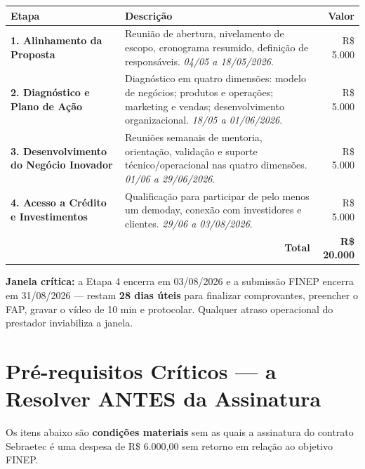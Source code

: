 \documentclass[11pt, a4paper]{article}
\newcommand{\destaque}[2]{%
    \vspace{2pt}
    \colorbox{#1!10}{%
        \parbox{\dimexpr\textwidth-2\fboxsep}{%
            \small #2%
        }%
    }
    \vspace{4pt}
}
\begin{document}
\renewcommand{\arraystretch}{1.25}
\begin{table}[H]
    \centering
    \small
    \begin{tabularx}{\textwidth}{@{} l X r @{}}
        \toprule
        \rowcolor{tableHeader} \textbf{Etapa} & \textbf{Descrição} & \textbf{Valor} \\
        \midrule
        \textbf{1. Alinhamento da Proposta} & Reunião de abertura, nivelamento de escopo, cronograma resumido, definição de responsáveis. \textit{04/05 a 18/05/2026}. & R\$ 5.000 \\
        \rowcolor{lightGray}
        \textbf{2. Diagnóstico e Plano de Ação} & Diagnóstico em quatro dimensões: modelo de negócios; produtos e operações; marketing e vendas; desenvolvimento organizacional. \textit{18/05 a 01/06/2026}. & R\$ 5.000 \\
        \textbf{3. Desenvolvimento do Negócio Inovador} & Reuniões semanais de mentoria, orientação, validação e suporte técnico/operacional nas quatro dimensões. \textit{01/06 a 29/06/2026}. & R\$ 5.000 \\
        \rowcolor{lightGray}
        \textbf{4. Acesso a Crédito e Investimentos} & Qualificação para participar de pelo menos um demoday, conexão com investidores e clientes. \textit{29/06 a 03/08/2026}. & R\$ 5.000 \\
        \midrule
        \multicolumn{2}{r}{\textbf{Total}} & \textbf{R\$ 20.000} \\
        \bottomrule
    \end{tabularx}
\end{table}

\destaque{warningOrange}{%
    \textcolor{warningOrange}{\textbf{Janela crítica:}} a Etapa 4 encerra em 03/08/2026 e a submissão FINEP encerra em 31/08/2026 --- restam \textbf{28 dias úteis} para finalizar comprovantes, preencher o FAP, gravar o vídeo de 10 min e protocolar. Qualquer atraso operacional do prestador inviabiliza a janela.%
}

\section{Pré-requisitos Críticos --- a Resolver ANTES da Assinatura}

Os itens abaixo são \textbf{condições materiais} sem as quais a assinatura do contrato Sebraetec é uma despesa de R\$ 6.000,00 sem retorno em relação ao objetivo FINEP.
\end{document}
